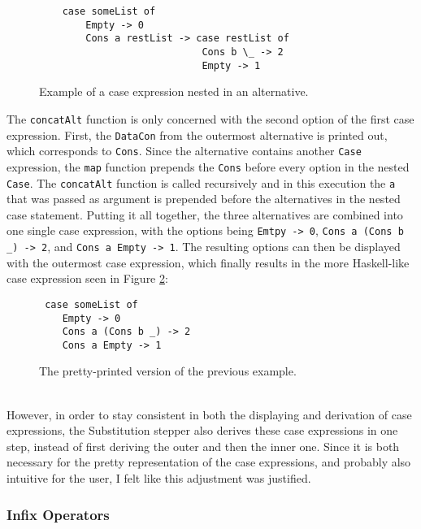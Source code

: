 \begin{figure}[ht!]
\begin{verbatim}
    case someList of
        Empty -> 0
        Cons a restList -> case restList of
                            Cons b \_ -> 2
                            Empty -> 1
\end{verbatim}
    \caption{Example of a case expression nested in an alternative.}
    \label{fig:concatAltExample}
\end{figure}

The \texttt{concatAlt} function is only concerned with the second option of the first case expression.
First, the \texttt{DataCon} from the outermost alternative is printed out,
which corresponds to \texttt{Cons}.
Since the alternative contains another \texttt{Case} expression,
the \texttt{map} function prepends the \texttt{Cons} before every option in the nested \texttt{Case}.
The \texttt{concatAlt} function is called recursively and in this execution the \texttt{a} that was passed as argument is prepended before the alternatives in the nested case statement.
Putting it all together, the three alternatives are combined into one single case expression,
with the options being \texttt{Emtpy -> 0}, \texttt{Cons a (Cons b \_) -> 2}, and \texttt{Cons a Empty -> 1}.
The resulting options can then be displayed with the outermost case expression,
which finally results in the more Haskell-like case expression seen in Figure \ref*{fig:concatAltExampleResolved}:

\begin{figure}[ht!]
\begin{verbatim}
 case someList of
    Empty -> 0
    Cons a (Cons b _) -> 2
    Cons a Empty -> 1
\end{verbatim}
    \caption{The pretty-printed version of the previous example.}
    \label{fig:concatAltExampleResolved}
\end{figure}

\ \\
However, in order to stay consistent in both the displaying and derivation of case expressions,
the Substitution stepper also derives these case expressions in one step,
instead of first deriving the outer and then the inner one.
Since it is both necessary for the pretty representation of the case expressions,
and probably also intuitive for the user, I felt like this adjustment was justified.

\subsubsection{Infix Operators}

